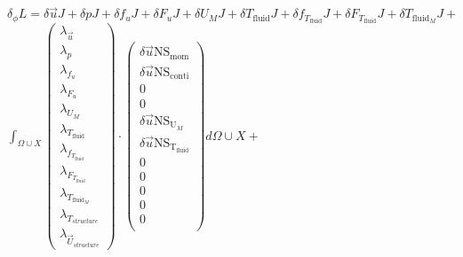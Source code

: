 \documentclass[10pt]{article} %
\begin{document}
\begin{center}
	$\delta_\phi L = \delta \vec{u} J + \delta p J + \delta f_u J + \delta F_u J + \delta U_M J +
	\delta T_{\text{fluid}} J + \delta f_{T_{\text{fluid}}} J + \delta F_{T_{\text{fluid}}} J + \delta T_{\text{fluid}_M} J +$\\
	$\int_{\Omega \cup X}
	\begin{pmatrix}
		\lambda_{\vec{u}} \\ \lambda_p \\ \lambda_{f_u} \\ \lambda_{F_u} \\ \lambda_{U_M}\\ \lambda_{T_{\text{fluid}}} \\ \lambda_{f_{T_{\text{fluid}}}} \\ \lambda_{F_{T_{\text{fluid}}}} \\ \lambda_{T_{\text{fluid}_M}} \\ \lambda_{T_{structure}} \\ \lambda_{\vec{U}_{structure}}
	\end{pmatrix}
	\cdot
	\begin{pmatrix}
		\delta \vec{u} \text{NS}_{\text{mom}} \\
		\delta \vec{u} \text{NS}_{\text{conti}}\\
		0 \\
		0 \\
		\delta \vec{u} \text{NS}_{\text{U}_M} \\
		\delta \vec{u} \text{NS}_{\text{T}_{\text{fluid}}} \\
		0\\
		0\\
		0\\
		0\\
		0\\
	\end{pmatrix}
	d\Omega \cup X + $\\


\end{center}
\end{document}
